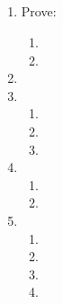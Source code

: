 \documentclass{article}
\title{
    \textmd{\bd{\hmwkClass:\ \hmwkTitle}}\\
}
\author{\hmwkAuthorName}
\begin{document}
\maketitle
\thispagestyle{firststyle}

\begin{enumerate}
    \item Prove:
          \begin{enumerate}
              \item 
              \item 
          \end{enumerate}

          \pagebreak

    \item 

          \pagebreak

    \item
          \begin{enumerate}
              \item 
              \item 
              \item 
          \end{enumerate}

          \pagebreak

    \item
          \begin{enumerate}
              \item 
              \item 
          \end{enumerate}

          \pagebreak

    \item
          \begin{enumerate}
              \item 
              \item 
              \item 
              \item 
          \end{enumerate}

\end{enumerate}
\end{document}
